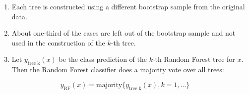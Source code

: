 \begin{enumerate}
\item Each tree is constructed using a different bootstrap sample from
  the original data.
\item About one-third of the cases are left out of the bootstrap
  sample and not used in the construction of the $k$-th tree.
\item Let $y_{\text{tree k}}(x)$ be the class prediction of the $k$-th
  Random Forest tree for $x$. Then the Random Forest classifier does a
  majority vote over all trees:
\end{enumerate}

\[
y_{\text{RF}}(x) = \text{majority}\{y_{\text{tree k}}(x), k=1, \ldots\}
\]

